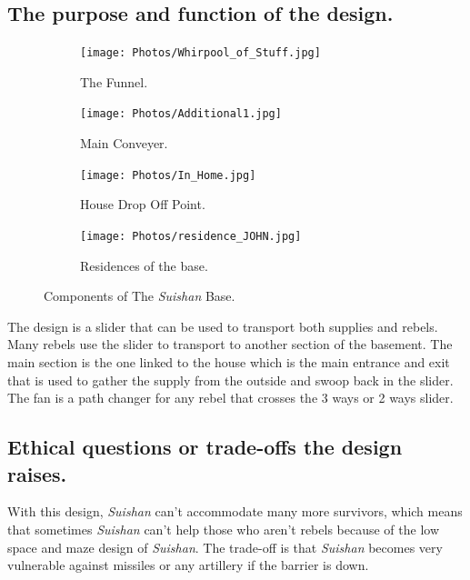 \documentclass[11pt]{book}
\begin{document}
			\subsection{The purpose and function of the design.}
				\begin{figure}[H]
						\begin{subfigure}{.5\textwidth}
 						\centering 						\texttt{[image: Photos/Whirpool\_of\_Stuff.jpg]}
  							\caption{The Funnel.}
	  						\label{fig:sfig1}
						\end{subfigure}
						\begin{subfigure}{.5\textwidth}
						\centering
 							\texttt{[image: Photos/Additional1.jpg]}
  							\caption{Main Conveyer.}
  							\label{fig:sfig2}
						\end{subfigure}
						\begin{subfigure}{.5\textwidth}
						\centering
 							\texttt{[image: Photos/In\_Home.jpg]}
  							\caption{House Drop Off Point.}
  							\label{fig:sfig3}
						\end{subfigure}
						\begin{subfigure}{.5\textwidth}
						\centering
 							\texttt{[image: Photos/residence\_JOHN.jpg]}
  							\caption{Residences of the base.}
  							\label{fig:sfig4}
						\end{subfigure}
					\caption{Components of The \textit{Suishan} Base.}
					\label{fig:fig}
				\end{figure}
				The design is a slider that can be used to transport both supplies and rebels. Many rebels use the slider to transport to another section of the basement. The main section is the one linked to the house which is the main entrance and exit that is used to gather the supply from the outside and swoop back in the slider. The fan is a path changer for any rebel that crosses the 3 ways or 2 ways slider.
				
				
			\subsection{Ethical questions or trade-offs the design raises.}
				With this design, \textit{Suishan} can’t accommodate many more survivors, which means that sometimes \textit{Suishan} can’t help those who aren’t rebels because of the low space and maze design of \textit{Suishan}. The trade-off is that \textit{Suishan} becomes very vulnerable against missiles or any artillery if the barrier is down. 
				
\end{document}
